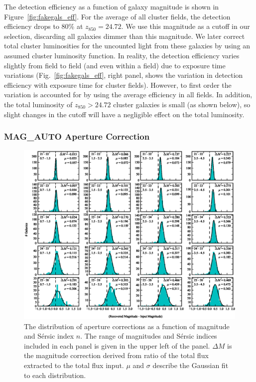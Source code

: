 The detection efficiency as a function of galaxy magnitude is shown in
Figure~\ref{fig:fakegals_eff}. For the average of all cluster fields,
the detection efficiency drops to 80\% at $z_{850} = 24.72$. We use
this magnitude as a cutoff in our selection, discarding all galaxies
dimmer than this magnitude.  We later correct total cluster
luminosities for the uncounted light from these galaxies by using an
assumed cluster luminosity function.  In reality, the detection
efficiency varies slightly from field to field (and even within a
field) due to exposure time variations (Fig.~\ref{fig:fakegals_eff},
right panel, shows the variation in detection efficiency with exposure
time for cluster fields). However, to first order the variation is
accounted for by using the average efficiency in all fields. In
addition, the total luminosity of $z_{850} > 24.72$ cluster galaxies
is small (as shown below), so slight changes in the cutoff will have a
negligible effect on the total luminosity.

\subsubsection{MAG\_AUTO Aperture Correction}

\begin{figure}[tp]
\includegraphics[angle=270]{figures/clrate/fakegals_grid_n.eps}
\caption[Aperture correction as a function of magnitude and S{\'e}rsic
index $n$]{The distribution of aperture corrections as a function of
magnitude and S{\'e}rsic index $n$. The range of magnitudes and
S{\'e}rsic indices included in each panel is given in the upper left
of the panel. $\Delta M$ is the magnitude correction derived from
ratio of the total flux extracted to the total flux input. $\mu$ and
$\sigma$ describe the Gaussian fit to each distribution. 
\label{fig:fakegals_grid_n}}
\end{figure}

